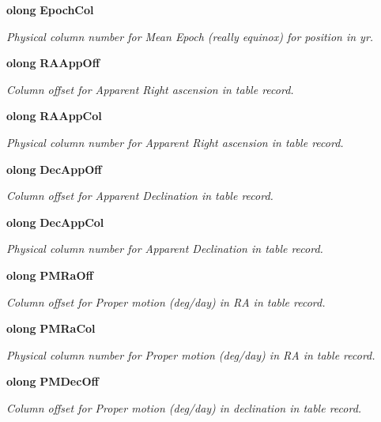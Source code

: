 \begin{CompactItemize}
{\bf olong} {\bf Epoch\-Col}
\begin{CompactList}\small\item\em Physical column number for Mean Epoch (really equinox) for position in yr. \item\end{CompactList}\item 
{\bf olong} {\bf RAApp\-Off}
\begin{CompactList}\small\item\em Column offset for Apparent Right ascension in table record. \item\end{CompactList}\item 
{\bf olong} {\bf RAApp\-Col}
\begin{CompactList}\small\item\em Physical column number for Apparent Right ascension in table record. \item\end{CompactList}\item 
{\bf olong} {\bf Dec\-App\-Off}
\begin{CompactList}\small\item\em Column offset for Apparent Declination in table record. \item\end{CompactList}\item 
{\bf olong} {\bf Dec\-App\-Col}
\begin{CompactList}\small\item\em Physical column number for Apparent Declination in table record. \item\end{CompactList}\item 
{\bf olong} {\bf PMRa\-Off}
\begin{CompactList}\small\item\em Column offset for Proper motion (deg/day) in RA in table record. \item\end{CompactList}\item 
{\bf olong} {\bf PMRa\-Col}
\begin{CompactList}\small\item\em Physical column number for Proper motion (deg/day) in RA in table record. \item\end{CompactList}\item 
{\bf olong} {\bf PMDec\-Off}
\begin{CompactList}\small\item\em Column offset for Proper motion (deg/day) in declination in table record. \item\end{CompactList}\item 

\end{CompactItemize}
